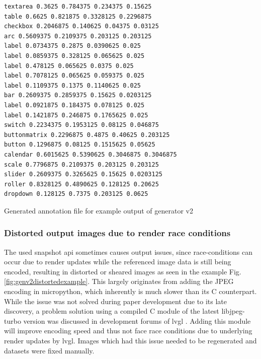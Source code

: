 \documentclass[Bachelor, BIC, english, fhCitStyle, IEEE]{BASE/twbook} %
\newcommand{\nocontentsline}[3]{}
\newcommand{\hidsubsubsection}[1]{\bgroup\let\addcontentsline=\nocontentsline\subsubsection{#1}\egroup}
\begin{document}
\begin{listing}[htbp]
    \begin{verbatim}
textarea 0.3625 0.784375 0.234375 0.15625
table 0.6625 0.821875 0.3328125 0.2296875
checkbox 0.2046875 0.140625 0.04375 0.03125
arc 0.5609375 0.2109375 0.203125 0.203125
label 0.0734375 0.2875 0.0390625 0.025
label 0.0859375 0.328125 0.065625 0.025
label 0.478125 0.065625 0.0375 0.025
label 0.7078125 0.065625 0.059375 0.025
label 0.1109375 0.1375 0.1140625 0.025
bar 0.2609375 0.2859375 0.15625 0.0203125
label 0.0921875 0.184375 0.078125 0.025
label 0.1421875 0.246875 0.1765625 0.025
switch 0.2234375 0.1953125 0.08125 0.046875
buttonmatrix 0.2296875 0.4875 0.40625 0.203125
button 0.1296875 0.08125 0.1515625 0.05625
calendar 0.6015625 0.5390625 0.3046875 0.3046875
scale 0.7796875 0.2109375 0.203125 0.203125
slider 0.2609375 0.3265625 0.15625 0.0203125
roller 0.8328125 0.4890625 0.128125 0.20625
dropdown 0.128125 0.7375 0.203125 0.0625
    \end{verbatim}
    \caption{Generated annotation file for example output of generator v2}
\end{listing}
\clearpage
\hidsubsubsection{Distorted output images due to render race conditions}
The used snapshot \ac{api} sometimes causes output issues, since race-conditions can occur due to render updates while the referenced image data is still being encoded, resulting in distorted or sheared images as seen in the example Fig.\ref{fig:genv2distortedexample}. This largely originates from adding the JPEG encoding in micropython, which inherently is much slower than its C counterpart. While the issue was not solved during paper development due to its late discovery, a problem solution using a compiled C module of the latest libjpeg-turbo \autocite{LibjpegturboLibjpegturbo2024} version was discussed in development forums of \ac{lvgl} \autocite{HowCanStore2024}. Adding this module will improve encoding speed and thus not face race conditions due to underlying render updates by \ac{lvgl}. Images which had this issue needed to be regenerated and datasets were fixed manually.
\end{document}
